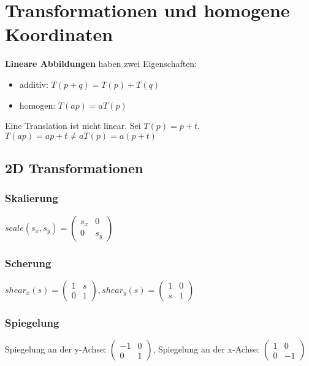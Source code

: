 \documentclass[paper=a4, fontsize=11pt]{scrartcl} %
\numberwithin{equation}{section} %
\numberwithin{figure}{section} %
\numberwithin{table}{section} %
\begin{document}
\section{Transformationen und homogene Koordinaten}

\textbf{Lineare Abbildungen} haben zwei Eigenschaften:
\begin{itemize}
\item additiv: $T(p+q) = T(p) + T(q)$
\item homogen: $T(ap) = aT(p)$
\end{itemize}

Eine Translation ist nicht linear. Sei $T(p) = p + t$. $T(ap) = ap + t \neq aT(p) = a(p+t)$

\subsection{2D Transformationen}

\subsubsection{Skalierung}

$scale(s_x,s_y) = 
\left(
   \begin{array}{cc}
     s_x & 0\\
     0 & s_y
   \end{array}
\right)$

\subsubsection{Scherung}

$shear_x(s) = 
\left(
   \begin{array}{cc}
     1 & s\\
     0 & 1
   \end{array}
\right),shear_y(s) = 
\left(
   \begin{array}{cc}
     1 & 0\\
     s & 1
   \end{array}
\right)$

\subsubsection{Spiegelung}

Spiegelung an der y-Achse: $\left(
   \begin{array}{cc}
     -1 & 0\\
     0 & 1
   \end{array}
\right)$, Spiegelung an der x-Achse: $\left(
   \begin{array}{cc}
     1 & 0\\
     0 & -1
   \end{array}
\right)$
\end{document}
